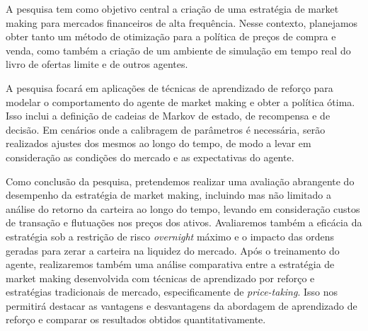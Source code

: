 A pesquisa tem como objetivo central a criação de uma estratégia de market making para mercados financeiros de alta frequência. Nesse contexto, planejamos obter tanto um método de otimização para a política de preços de compra e venda, como também a criação de um ambiente de simulação em tempo real do livro de ofertas limite e de outros agentes. 

A pesquisa focará em aplicações de técnicas de aprendizado de reforço para modelar o comportamento do agente de market making e obter a política ótima. Isso inclui a definição de cadeias de Markov de estado, de recompensa e de decisão. 
Em cenários onde a calibragem de parâmetros é necessária, serão realizados ajustes dos mesmos ao longo do tempo, de modo a levar em consideração as condições do mercado e as expectativas do agente.

Como conclusão da pesquisa, pretendemos realizar uma avaliação abrangente do desempenho da estratégia de market making, incluindo mas não limitado a análise do retorno da carteira ao longo do tempo, levando em consideração custos de transação e flutuações nos preços dos ativos. Avaliaremos também a eficácia da estratégia sob a restrição de risco \textit{overnight} máximo e o impacto das ordens geradas para zerar a carteira na liquidez do mercado. Após o  treinamento do agente, realizaremos também uma análise comparativa entre a estratégia de market making desenvolvida com técnicas de aprendizado por reforço e estratégias tradicionais de mercado, especificamente de \textit{price-taking}. Isso nos permitirá destacar as vantagens e desvantagens da abordagem de aprendizado de reforço e comparar os resultados obtidos quantitativamente.
